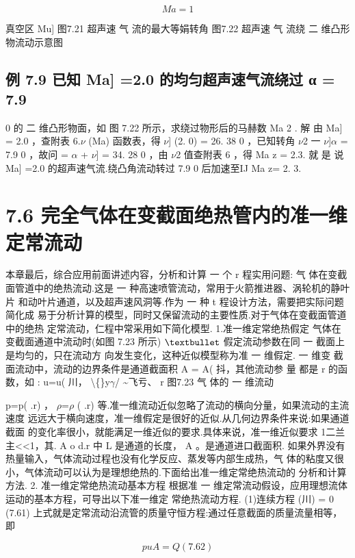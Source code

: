 \[Ma=1\]

真空区 Mu] 图7.21 超声速 气 流的最大等娟转角 图7.22 超声速 气 流绕 二 维凸形物流动示意图

\subsection*{例 7.9  已知 Ma] =2.0 的均匀超声速气流绕过 α = 7.9}

0 的 二 维凸形物面，如 图 7.22 所示，求绕过物形后的马赫数 Ma 2 . 解 由 Ma] = 2.0 ，查附表 6.$\nu$ (Ma) 函数表，得 $\nu$] (2. 0) = 26. 38 0 ，已知转角 $\nu$2 一 $\nu$]$\alpha$ = 7.9 0 ，故问 = $\alpha$ + $\nu$] = 34. 28 0 ，由 $\nu$2 值查附表 6 ，得 Ma z = 2.3. 就 是 说 Ma] =2.0 的超声速气流.绕凸角流动转过 7.9 0 后加速至IJ Ma z= 2. 3.

\section*{7.6  完全气体在变截面绝热管内的准一维定常流动}

本章最后，综合应用前面讲述内容，分析和计算 一 个 r 程实用问题: 气 体在变截 面管道中的绝热流动.这是 一 种高速喷管流动，常用于火箭推进器、涡轮机的静叶片 和动叶片通道，以及超声速风洞等.作为 一 种 t 程设计方法，需要把实际问题简化成 易于分析计算的模型，同时又保留流动的主要性质.对于气体在变截面管道中的绝热 定常流动，仁程中常采用如下简化模型. 1.准一维定常绝热假定 气体在变截面通道中流动时(如图 7.23 所示) ${\rm •}$ 假定流动参数在同 一 截面上是均匀的，只在流动方 向发生变化，这种近似模型称为准 一 维假定. 一 维变 截面流动中，流动的边界条件是通道截面积 A = A( 抖，其他流动参 量 都是 r 的函数，如 : u=u( 川， \textbackslash\{\}y$\gamma$/ \textasciitilde{}飞亏、 r 图7.23 气 体的 一 维流动

p=p( .r) ， $\rho$=$\rho$ ( .r) 等.准一维流动近似忽略了流动的横向分量，如果流动的主流速度 远远大于横向速度，准一维假定是很好的近似.从几何边界条件来说:如果通道截面 的变化率很小，就能满足一维近似的要求.具体来说，准一维近似要求 1二兰主<<1，其. A o d.r 中 L 是通道的长度， A 。是通道进口截面积. 如果外界没有热量输入，气体流动过程也没有化学反应、蒸发等内部生成热，气 体的粘度又很小，气体流动可以认为是理想绝热的.下面给出准一维定常绝热流动的 分析和计算方法. 2. 准一维定常绝热流动基本方程 根据准 一 维定常流动假设，应用理想流体运动的基本方程，可导出以下准一维定 常绝热流动方程. (1)连续方程 (川) = 0 (7.61) 上式就是定常流动沿流管的质量守恒方程:通过任意截面的质量流量相等，即

\[puA = Q (7. 62)\]

